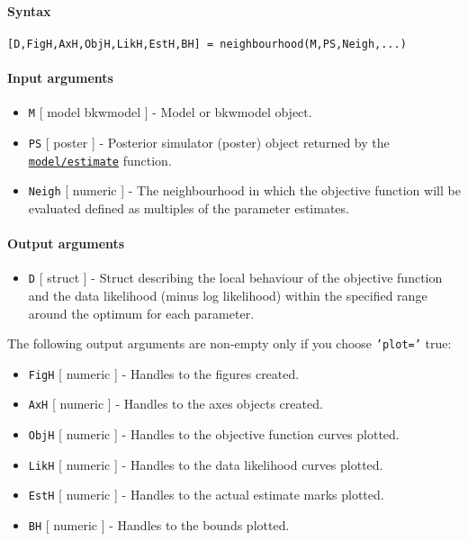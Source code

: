 


	\paragraph{Syntax}

\begin{verbatim}
[D,FigH,AxH,ObjH,LikH,EstH,BH] = neighbourhood(M,PS,Neigh,...)
\end{verbatim}

\paragraph{Input arguments}

\begin{itemize}
\item
  \texttt{M} {[} model \textbar{} bkwmodel {]} - Model or bkwmodel
  object.
\item
  \texttt{PS} {[} poster {]} - Posterior simulator (poster) object
  returned by the \href{model/estimate}{\texttt{model/estimate}}
  function.
\item
  \texttt{Neigh} {[} numeric {]} - The neighbourhood in which the
  objective function will be evaluated defined as multiples of the
  parameter estimates.
\end{itemize}

\paragraph{Output arguments}

\begin{itemize}
\itemsep1pt\parskip0pt
\item
  \texttt{D} {[} struct {]} - Struct describing the local behaviour of
  the objective function and the data likelihood (minus log likelihood)
  within the specified range around the optimum for each parameter.
\end{itemize}

The following output arguments are non-empty only if you choose
\texttt{'plot='} true:

\begin{itemize}
\item
  \texttt{FigH} {[} numeric {]} - Handles to the figures created.
\item
  \texttt{AxH} {[} numeric {]} - Handles to the axes objects created.
\item
  \texttt{ObjH} {[} numeric {]} - Handles to the objective function
  curves plotted.
\item
  \texttt{LikH} {[} numeric {]} - Handles to the data likelihood curves
  plotted.
\item
  \texttt{EstH} {[} numeric {]} - Handles to the actual estimate marks
  plotted.
\item
  \texttt{BH} {[} numeric {]} - Handles to the bounds plotted.
\end{itemize}

